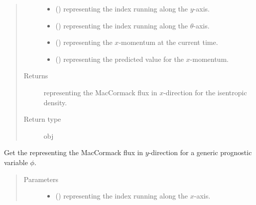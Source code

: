 \documentclass[letterpaper,10pt,english]{sphinxmanual}
\begin{document}
\begin{fulllineitems}
\begin{fulllineitems}
\begin{quote}
\begin{description}
\begin{itemize}
\item {} 
 () \textendash{}  representing the index running along the \(y\)-axis.

\item {} 
 () \textendash{}  representing the index running along the \(\theta\)-axis.

\item {} 
 () \textendash{}  representing the \(x\)-momentum at the current time.

\item {} 
 () \textendash{}  representing the predicted value for the \(x\)-momentum.

\end{itemize}

\item[{Returns}] \leavevmode
{} representing the MacCormack flux in \(x\)-direction for the isentropic density.

\item[{Return type}] \leavevmode
obj

\end{description}\end{quote}

\end{fulllineitems}


\begin{fulllineitems}
\label{\detokenize{api:dycore.flux_isentropic_maccormack.FluxIsentropicMacCormack._get_maccormack_flux_y}}
Get the  representing the MacCormack flux in \(y\)-direction
for a generic prognostic variable \(\phi\).
\begin{quote}\begin{description}
\item[{Parameters}] \leavevmode\begin{itemize}
\item {} 
 () \textendash{}  representing the index running along the \(x\)-axis.


\end{itemize}
\end{description}
\end{quote}
\end{fulllineitems}
\end{fulllineitems}
\end{document}
